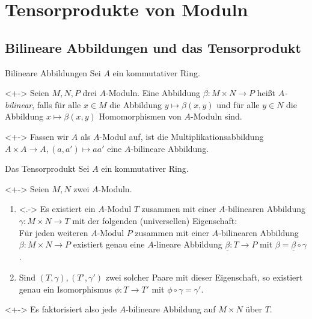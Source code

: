 \section{Tensorprodukte von Moduln}

\subsection{Bilineare Abbildungen und das Tensorprodukt}

\begin{frame}{Bilineare Abbildungen}
	Sei \(A\) ein kommutativer Ring.
	\begin{definition}<+->
		Seien \(M, N, P\) drei \(A\)-Moduln. Eine Abbildung \(\beta\colon M \times N \to P\) heißt
		\emph{\(A\)-bilinear}, falls für alle \(x \in M\) die Abbildung \(y \mapsto \beta(x, y)\) und für
		alle \(y \in N\) die Abbildung \(x \mapsto \beta(x, y)\) Homomorphismen von \(A\)-Moduln sind.
	\end{definition}
	\begin{example}<+->
		Fassen wir \(A\) als \(A\)-Modul auf, ist die Multiplikationsabbildung \(A \times A \to A,
		(a, a') \mapsto a a'\) eine \(A\)-bilineare Abbildung.
	\end{example}
\end{frame}

\begin{frame}{Das Tensorprodukt}
	Sei \(A\) ein kommutativer Ring.
	\begin{proposition}<+->
		Seien \(M, N\) zwei \(A\)-Moduln. 
		\begin{enumerate}[<+->]
		\item<.->
			Es existiert ein \(A\)-Modul \(T\) zusammen mit einer
			\(A\)-bilinearen Abbildung \(\gamma\colon M \times N \to T\) mit der folgenden
			(universellen) Eigenschaft:
			\\	
			Für jeden weiteren \(A\)-Modul \(P\) zusammen mit einer \(A\)-bilinearen Abbildung
			\(\beta\colon M \times N \to P\) existiert genau eine \(A\)-lineare Abbildung
			\(\underline\beta\colon 
			T \to P\) mit \(\beta = \underline\beta \circ \gamma\).
		\item	
			Sind \((T, \gamma), (T', \gamma')\) zwei solcher Paare mit dieser Eigenschaft, so
			existiert genau ein Isomorphismus \(\phi\colon T \to T'\) mit \(\phi\circ \gamma = \gamma'\). 
		\end{enumerate}
	\end{proposition}
	\begin{visibleenv}<+->
		Es faktorisiert also jede \(A\)-bilineare Abbildung auf \(M \times N\) über \(T\).
	\end{visibleenv}
\end{frame}

